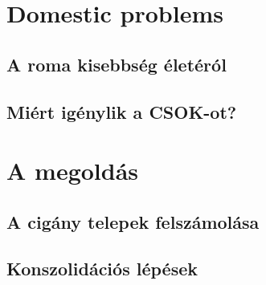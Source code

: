 \documentclass[12pt, twoside, twocolumn]{article}
\begin{document}
\begin{verse}
\hulipsum[2-3]
\end{verse}

\appendix
\section{Domestic problems}
\subsection{A roma kisebbség életéról}
\hulipsum[15]
\subsection{Miért igénylik a CSOK-ot?}
\hulipsum[12]

\section{A megoldás}
\subsection{A cigány telepek felszámolása}
\hulipsum[8]
\subsection{Konszolidációs lépések}
\marginpar{\hulipsum[1]}
\hulipsum[9]
\end{document}

